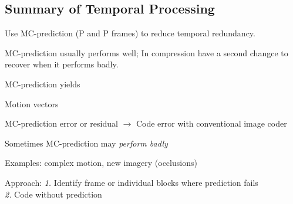 \begin{compactdesc}
\section{Summary of Temporal Processing}
	\begin{enumerate*}[label=\protect\circled{\arabic*},itemjoin=]
		\item Use MC-prediction (P and P frames) to reduce temporal redundancy.\\
		\item MC-prediction usually performs well; In compression have a second changce to recover when it performs badly.\\
		\item MC-prediction yields\\
			\begin{enumerate*}[label=\quad\protect\circled{\alph*},itemjoin=]
				\item Motion vectors\\
				\item MC-prediction error or residual $\to$ Code error with conventional image coder\\
			\end{enumerate*}
		\item Sometimes MC-prediction may \emph{perform badly}\\
			\begin{enumerate*}[label=\quad\protect\circled{\alph*},itemjoin=]
				\item Examples: complex motion, new imagery (occlusions)\\
				\item Approach: \emph{1.} Identify frame or individual blocks where prediction fails \\
					\emph{2.} Code without prediction
			\end{enumerate*}
	\end{enumerate*}

\end{compactdesc}

